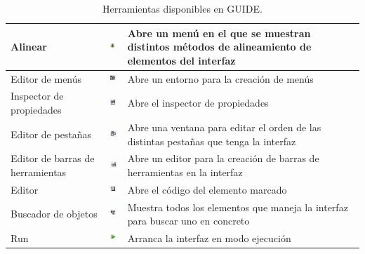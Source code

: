 \begin{table}[H]
\begin{center}
{\begin{tabular}{|l|c|l|}
Alinear&\includegraphics{imagenes/iconosguide/align.png}  &Abre un menú en el que se muestran distintos métodos de alineamiento de elementos del interfaz\\ \hline
Editor de menús &\includegraphics{imagenes/iconosguide/menueditor.png} &Abre un entorno para la creación de menús\\ \hline
Inspector de propiedades&\includegraphics{imagenes/iconosguide/propert.png}  &Abre el inspector de propiedades\\ \hline
Editor de pestañas &\includegraphics{imagenes/iconosguide/tabordereditor.png} &Abre una ventana para editar el orden de las distintas pestañas que tenga la interfaz\\ \hline
Editor de barras de herramientas&\includegraphics{imagenes/iconosguide/toolbareditor.png} &Abre un editor para la creación de barras de herramientas en la interfaz  \\ \hline
Editor&\includegraphics{imagenes/iconosguide/editor.png}  & Abre el código del elemento marcado\\ \hline
Buscador de objetos&\includegraphics{imagenes/iconosguide/object.png} &Muestra todos los elementos que maneja la interfaz para buscar uno en concreto \\ \hline
Run&\includegraphics{imagenes/iconosguide/run.png}  & Arranca la interfaz en modo ejecución\\ \hline
\end{tabular}
}
\caption{Herramientas disponibles en GUIDE.}
\end{center}
\end{table}
\bigskip

